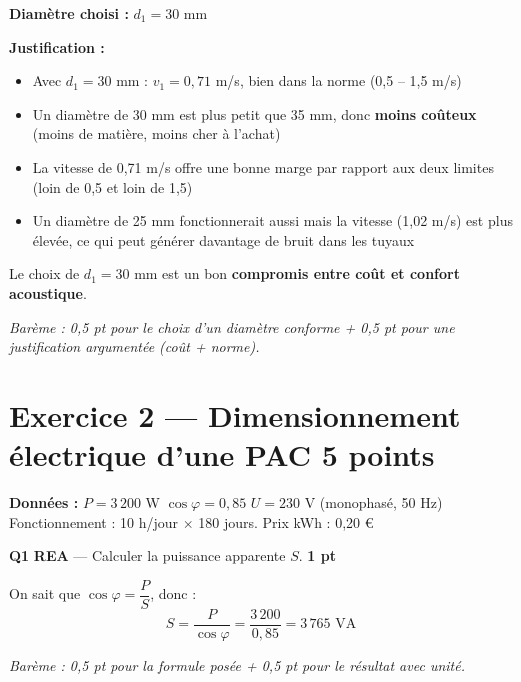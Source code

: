 \documentclass[a4paper,11pt]{article}
\newcommand{\pts}[1]{\hfill\textcolor{gris}{\small\textbf{#1}}}
\newcommand{\comp}[1]{\colorbox{blue!10}{\scriptsize\textbf{#1}}}
\begin{document}
\begin{corrbox}
\textbf{Diamètre choisi :} $d_1 = \boxed{30 \text{ mm}}$

\textbf{Justification :}
\begin{itemize}[nosep]
  \item Avec $d_1 = 30$ mm : $v_1 = 0{,}71$ m/s, bien dans la norme (0,5 – 1,5 m/s)
  \item Un diamètre de 30 mm est plus petit que 35 mm, donc \textbf{moins coûteux} (moins de matière, moins cher à l'achat)
  \item La vitesse de 0,71 m/s offre une bonne marge par rapport aux deux limites (loin de 0,5 et loin de 1,5)
  \item Un diamètre de 25 mm fonctionnerait aussi mais la vitesse (1,02 m/s) est plus élevée, ce qui peut générer davantage de bruit dans les tuyaux
\end{itemize}

Le choix de $d_1 = 30$ mm est un bon \textbf{compromis entre coût et confort acoustique}.

\smallskip
\textit{Barème : 0,5 pt pour le choix d'un diamètre conforme + 0,5 pt pour une justification argumentée (coût + norme).}
\end{corrbox}

\newpage

\section*{Exercice 2 — Dimensionnement électrique d'une PAC \pts{5 points}}

\begin{contextebox}
\textbf{Données :} $P = 3\,200$ W \quad $\cos\varphi = 0{,}85$ \quad $U = 230$ V (monophasé, 50 Hz)\\
Fonctionnement : 10 h/jour $\times$ 180 jours. Prix kWh : 0,20 €
\end{contextebox}

\vspace{6pt}

\textbf{Q1} \comp{REA} — Calculer la puissance apparente $S$. \pts{1 pt}

\begin{corrbox}
On sait que $\cos\varphi = \dfrac{P}{S}$, donc :
\[
S = \frac{P}{\cos\varphi} = \frac{3\,200}{0{,}85} = \boxed{3\,765 \text{ VA}}
\]

\textit{Barème : 0,5 pt pour la formule posée + 0,5 pt pour le résultat avec unité.}
\end{corrbox}
\end{document}
